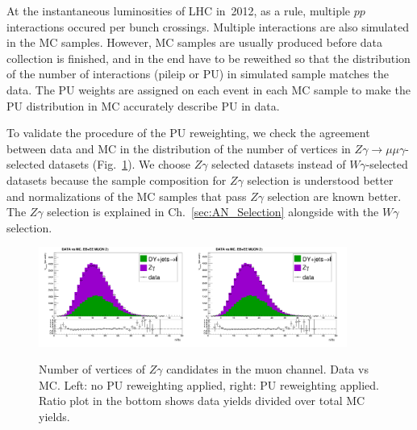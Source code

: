 At the instantaneous luminosities of LHC in~2012, as a rule, multiple $pp$ interactions occured per bunch crossings. Multiple interactions are also simulated in the MC samples. However, MC samples are usually produced before data collection is finished, and in the end have to be reweithed so that the distribution of the number of interactions (pileip or PU) in simulated sample matches the data. The PU weights are assigned on each event in each MC sample to make the PU distribution in MC accurately describe PU in data.



To validate the procedure of the PU reweighting, we check the agreement between data and MC in the distribution of the number of vertices in $Z\gamma\rightarrow\mu\mu\gamma$-selected datasets (Fig.~\ref{fig:DATAvsMC_nVtx}). We choose $Z\gamma$ selected datasets instead of $W\gamma$-selected datasets because the sample composition for $Z\gamma$ selection is understood better and normalizations of the MC samples that pass $Z\gamma$ selection are known better. The $Z\gamma$ selection is explained in Ch.~\ref{sec:AN_Selection} alongside with the $W\gamma$ selection.

\begin{figure}[htb]
  \begin{center}
   \includegraphics[width=0.45\textwidth]{../figs/figs_v11/MUON_ZGamma/PrepareYields/c_TotalDATAvsMC_EtaCommon__nVtx_noPU.png}\includegraphics[width=0.45\textwidth]{../figs/figs_v11/MUON_ZGamma/PrepareYields/c_TotalDATAvsMC_EtaCommon__nVtx.png}
  \caption{Number of vertices of $Z\gamma$ candidates in the muon channel. Data vs MC. Left: no PU reweighting applied, right: PU reweighting applied. Ratio plot in the bottom shows data yields divided over total MC yields.}
  \label{fig:DATAvsMC_nVtx}
  \end{center}
\end{figure}
